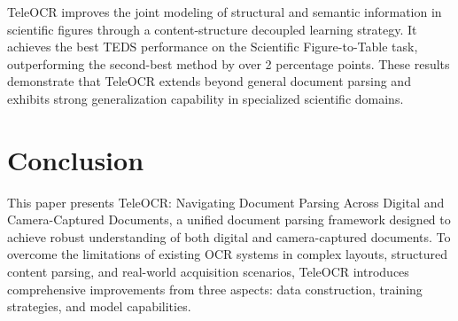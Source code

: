\documentclass{fairmeta}
\begin{document}
TeleOCR improves the joint modeling of structural and semantic information in scientific figures through a content-structure decoupled learning strategy. It achieves the best TEDS performance on the Scientific Figure-to-Table task, outperforming the second-best method by over 2 percentage points. These results demonstrate that TeleOCR extends beyond general document parsing and exhibits strong generalization capability in specialized scientific domains.


\begin{table}[htb]
\centering
\scriptsize
\caption{Data Extraction performance comparison among the top-5 teams and the best baseline in the ICDAR 2026 Sci-ImageMiner Challenge.}
\label{tab:leaderboard_data_extraction}
\end{table}


\section{Conclusion}
\label{sec:conclusion}
This paper presents TeleOCR: Navigating Document Parsing Across Digital and Camera-Captured Documents, a unified document parsing framework designed to achieve robust understanding of both digital and camera-captured documents. To overcome the limitations of existing OCR systems in complex layouts, structured content parsing, and real-world acquisition scenarios, TeleOCR introduces comprehensive improvements from three aspects: data construction, training strategies, and model capabilities.
\end{document}
